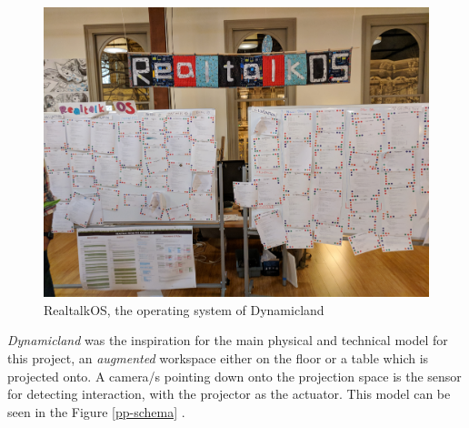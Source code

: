 \documentclass[12pt]{report}
\begin{document}
\begin{figure}[htbp]
\centering
\includegraphics[width=15cm]{assets/realtalk-os.jpg}
\caption{RealtalkOS, the operating system of Dynamicland}
\end{figure} 

\emph{Dynamicland} was the inspiration for the main physical and technical model for
this project, an \emph{augmented} workspace either on the floor or a table which is
projected onto. A camera/s pointing down onto the projection space is the sensor
for detecting interaction, with the projector as the actuator. This model can be
seen in the Figure \ref{pp-schema} .
\end{document}
